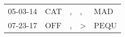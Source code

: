 \begin{supertabular}{lllll}
 05-03-14 &  CAT &  , &             , &   MAD \\
 07-23-17 &  OFF &  , &  \textgreater &  PEQU \\
\end{supertabular}
